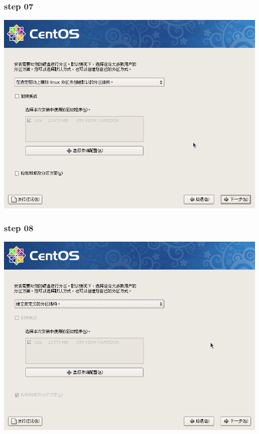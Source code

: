 \documentclass[xcolor=svgnames,presentation]{beamer}
\begin{document}
\begin{frame}
\frametitle{step 07}
\label{sec-2-7}

\begin{center}
\includegraphics[width=.9\linewidth]{img/img13.png}
\end{center}
\end{frame}
\begin{frame}
\frametitle{step 08}
\label{sec-2-8}

\begin{center}
\includegraphics[width=.9\linewidth]{img/img14.png}
\end{center}
\end{frame}
\end{document}
